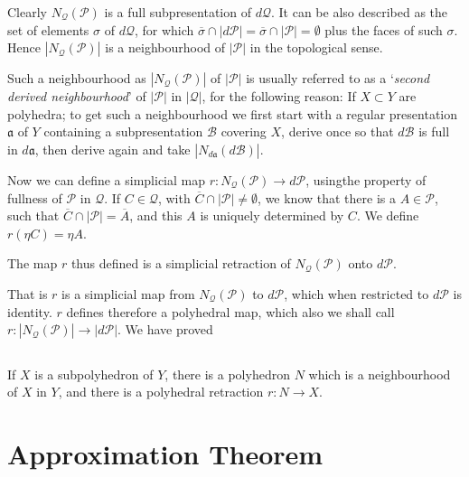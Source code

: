Clearly $N_{\mathcal{Q}}(\mathscr{P})$ is a full subpresentation of $d\mathcal{Q}$. It can be also described as the set of elements $\sigma$ of $d\mathcal{Q}$, for which $\overline{\sigma}\cap |d\mathscr{P}|=\overline{\sigma}\cap |\mathscr{P}|=\emptyset$ plus the faces of such $\sigma$. Hence $|N_{\mathcal{Q}}(\mathscr{P})|$ is a neighbourhood of $|\mathscr{P}|$ in the topological sense.

Such a neighbourhood as $|N_{\mathcal{Q}}(\mathscr{P})|$ of $|\mathscr{P}|$ is usually referred to as a `{\em second derived neighbourhood}' of $|\mathscr{P}|$ in $|\mathcal{Q}|$, for the following reason: If $X\subset Y$ are polyhedra; to get such a neighbourhood we first start with a regular presentation $\mathfrak{a}$ of $Y$ containing a subpresentation $\mathscr{B}$ covering $X$, derive once so that $d\mathscr{B}$ is full in $d\mathfrak{a}$, then derive again and take $|N_{d\mathfrak{a}}(d\mathscr{B})|$. 

Now we can define a simplicial map $r:N_{\mathcal{Q}}(\mathscr{P})\to d\mathscr{P}$, using\pageoriginale the property of fullness of $\mathscr{P}$ in $\mathcal{Q}$. If $C\in\mathcal{Q}$, with $\overline{C}\cap |\mathscr{P}|\neq\emptyset$, we know that there is a $A\in\mathscr{P}$, such that $\overline{C}\cap |\mathscr{P}|=\overline{A}$, and this $A$ is uniquely determined by $C$. We define $r(\eta C)=\eta A$.

\begin{ex}\label{chap3-ex3.1.3}
The map $r$ thus defined is a simplicial retraction of $N_{\mathcal{Q}}(\mathscr{P})$ onto $d\mathscr{P}$.
\end{ex}

That is $r$ is a simplicial map from $N_{\mathcal{Q}}(\mathscr{P})$ to $d\mathscr{P}$, which when restricted to $d\mathscr{P}$ is identity. $r$ defines therefore a polyhedral map, which also we shall call $r:|N_{\mathcal{Q}}(\mathscr{P})|\to |d\mathscr{P}|$. We have proved  

\setcounter{subsection}{3}
\subsection{}\label{chap3-sec3.1.4}
If $X$ is a subpolyhedron of $Y$, there is a polyhedron $N$ which is a neighbourhood of $X$ in $Y$, and there is a polyhedral retraction $r:N\to X$. 

\section{Approximation Theorem}\label{chap3-sec3.2}

